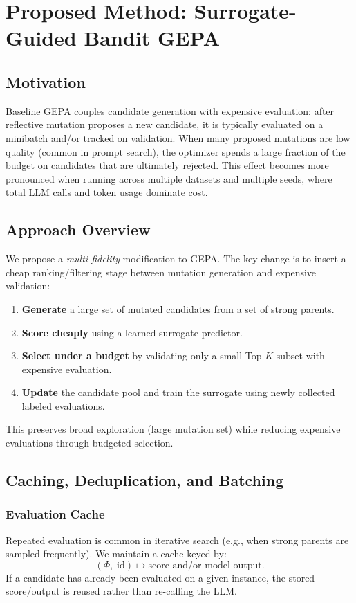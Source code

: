 \chapter{Proposed Method: Surrogate-Guided Bandit GEPA}
\label{ch:method}

\section{Motivation}
Baseline GEPA couples candidate generation with expensive evaluation: after reflective mutation proposes a new candidate, it is typically evaluated on a minibatch and/or tracked on validation. When many proposed mutations are low quality (common in prompt search), the optimizer spends a large fraction of the budget on candidates that are ultimately rejected. This effect becomes more pronounced when running across multiple datasets and multiple seeds, where total LLM calls and token usage dominate cost.

\section{Approach Overview}
We propose a \emph{multi-fidelity} modification to GEPA. The key change is to insert a cheap ranking/filtering stage between mutation generation and expensive validation:
\begin{enumerate}
    \item \textbf{Generate} a large set of mutated candidates from a set of strong parents.
    \item \textbf{Score cheaply} using a learned surrogate predictor.
    \item \textbf{Select under a budget} by validating only a small Top-$K$ subset with expensive evaluation.
    \item \textbf{Update} the candidate pool and train the surrogate using newly collected labeled evaluations.
\end{enumerate}
This preserves broad exploration (large mutation set) while reducing expensive evaluations through budgeted selection.

\section{Caching, Deduplication, and Batching}
\subsection{Evaluation Cache}
Repeated evaluation is common in iterative search (e.g., when strong parents are sampled frequently). We maintain a cache keyed by:
\[
(\Phi,\; \text{id}) \mapsto \text{score and/or model output}.
\]
If a candidate has already been evaluated on a given instance, the stored score/output is reused rather than re-calling the LLM.

